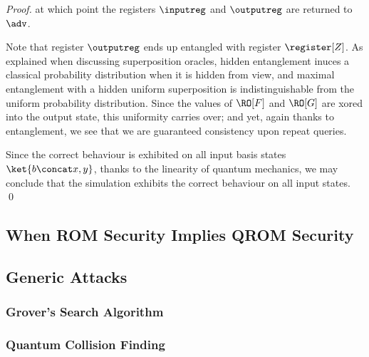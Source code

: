 \begin{proof}
      \noindent
      at which point the registers $\inputreg$ and $\outputreg$ are returned to $\adv$.  

      Note that register $\outputreg$ ends up entangled with register $\register[Z]$. As
        explained when discussing superposition oracles, hidden entanglement
        inuces a classical probability distribution when it is hidden from view, and
        maximal entanglement with a hidden uniform superposition is
        indistinguishable from the uniform probability distribution. Since the values of
        $\RO[F]$ and $\RO[G]$ are xored into the output state, this uniformity
        carries over; and yet, again thanks to entanglement, we see that we are
        guaranteed consistency upon repeat queries. 

      Since the correct behaviour is exhibited on all input basis states
        $\ket{b \concat x, y}$, thanks to the linearity of quantum mechanics,
        we may conclude that the simulation exhibits the correct behaviour on
        all input states.
      \qed
    \end{proof}

  \subsection{When ROM Security Implies QROM Security}
    

  \subsection{Generic Attacks}
    \subsubsection{Grover's Search Algorithm}
    \subsubsection{Quantum Collision Finding}
